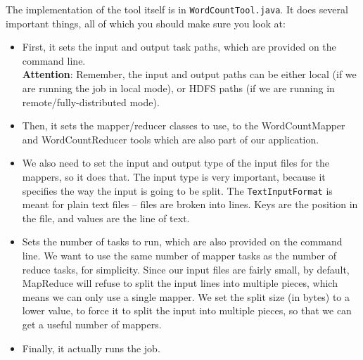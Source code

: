 \documentclass[a4paper,11pt]{article}
\begin{document}
  The implementation of the tool itself is in \texttt{WordCountTool.java}. It does several important things, all of which
  you should make sure you look at:

  \begin{itemize}
	  \item First, it sets the input and output task paths, which are provided on the command line. \\
		  \textbf{Attention}: Remember, the input and output paths can be either local (if we are running the job in local mode), or HDFS paths (if we are running in remote/fully-distributed mode).

	  \item Then, it sets the mapper/reducer classes to use, to the WordCountMapper and WordCountReducer tools which are
		  also part of our application.

	  \item We also need to set the input and output type of the input files for the mappers, so it does that.
  The input type is very important, because it specifies the way the input is going to be split. The \texttt{TextInputFormat} is meant for plain text files -- files are broken into lines. Keys are the position in the file, and values are the line of text.
  
	  \item Sets the number of tasks to run, which are also provided on the command line. We want to use the same number
		  of mapper tasks as the number of reduce tasks, for simplicity. Since our input files are fairly
		  small, by default, MapReduce will refuse to split the input lines into multiple pieces, which means
		  we can only use a single mapper. We set the split size (in bytes) to a lower value, to force it to
		  split the input into multiple pieces, so that we can get a useful number of mappers.

	  \item Finally, it actually runs the job.
  \end{itemize}

  
\end{document}
